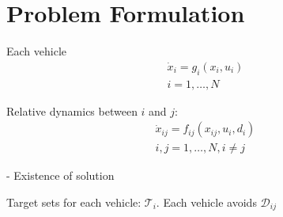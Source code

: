 \section{Problem Formulation \label{sec:formulation}}
Each vehicle
\begin{equation}
\begin{aligned}
\dot{x}_i = g_i(x_i, u_i) \\
i = 1,\ldots, N
\end{aligned}
\end{equation}

Relative dynamics between $i$ and $j$:
\begin{equation}
\begin{aligned}
\dot{x}_{ij} = f_{ij}(x_{ij}, u_i, d_i) \\
i, j = 1, \ldots, N, i\neq j
\end{aligned}
\end{equation}

- Existence of solution

Target sets for each vehicle: $\mathcal{T}_i$. Each vehicle avoids $\mathcal{D}_{ij}$